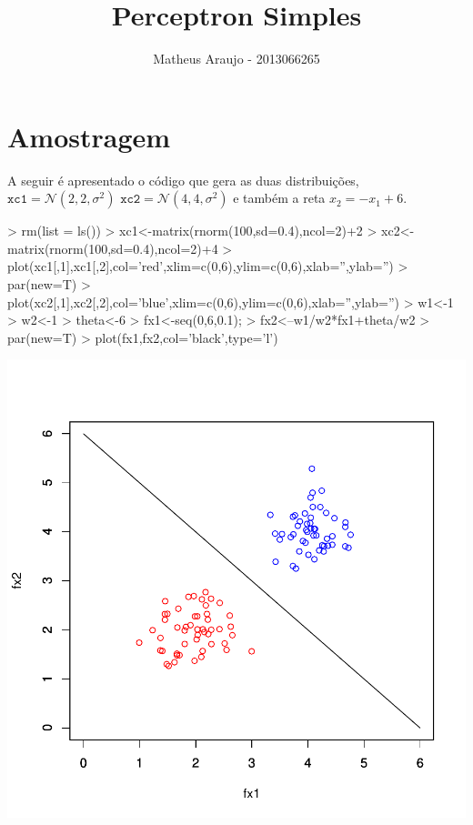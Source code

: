 \documentclass{article}
\begin{document}


\title{Perceptron Simples}
\author{Matheus Araujo - 2013066265}
\date{}

\maketitle

\section{Amostragem}

A seguir é apresentado o código que gera as duas distribuições, $\texttt{xc1} = \mathcal{N}(2,2,\sigma^2)$ $\texttt{xc2} = \mathcal{N}(4,4,\sigma^2)$ e também a reta $x_2 = -x_1+6$.

\begin{Schunk}
\begin{Sinput}
>   rm(list = ls())
>   xc1<-matrix(rnorm(100,sd=0.4),ncol=2)+2
>   xc2<-matrix(rnorm(100,sd=0.4),ncol=2)+4
>   plot(xc1[,1],xc1[,2],col='red',xlim=c(0,6),ylim=c(0,6),xlab='',ylab='')
>   par(new=T)
>   plot(xc2[,1],xc2[,2],col='blue',xlim=c(0,6),ylim=c(0,6),xlab='',ylab='')
>   w1<-1
>   w2<-1
>   theta<-6
>   fx1<-seq(0,6,0.1);
>   fx2<--w1/w2*fx1+theta/w2
>   par(new=T)
>   plot(fx1,fx2,col='black',type='l')
\end{Sinput}
\end{Schunk}
\includegraphics{perceptron_simples-001}
\end{document}
